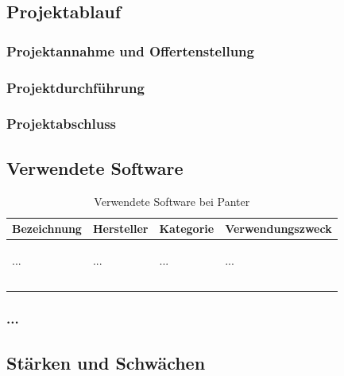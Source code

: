 \subsection{Projektablauf}

\subsubsection{Projektannahme und Offertenstellung}

\subsubsection{Projektdurchführung}

\subsubsection{Projektabschluss}

\subsection{Verwendete Software}

\begin{center}
    \begin{longtable}{lllp{6cm}}
        \toprule \textbf{Bezeichnung} & \textbf{Hersteller} & \textbf{Kategorie} & \textbf{Verwendungszweck} \\
        \midrule ... & ... & ... & 
            \begin{minipage}[t]{6cm}
                \begin{compactitem}
                    \item ...
                \end{compactitem}
            \end{minipage}
            \\\\
        \bottomrule
        \caption{Verwendete Software bei Panter}
        \label{tab:verwendete_software_panter}
    \end{longtable}
\end{center}

\subsubsection{...}

\subsection{Stärken und Schwächen}

